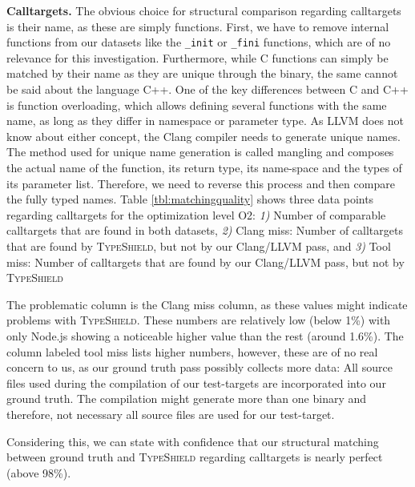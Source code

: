 \textbf{Calltargets.} The obvious choice for structural comparison regarding calltargets is their name, as these are simply functions. First, we have to remove internal 
functions from our datasets like the \texttt{\_init} or \texttt{\_fini} functions, which are of no relevance for this investigation. Furthermore, while C functions can
simply be matched by their name as they are unique through the binary, the same cannot be said about the language C++. One of the key differences between C and C++ is 
function overloading, which allows defining several functions with the same name, as long as they differ in namespace or parameter type. 
As LLVM does not know about either concept, the Clang compiler needs to generate unique names. The method used for unique name generation is called mangling and composes
the actual name of the function, its return type, its name-space and the types of its parameter list. Therefore, we need to reverse this process and then compare the fully
typed names. Table \ref{tbl:matchingquality} shows three data points regarding calltargets for the optimization level O2:
\textit{1)} Number of comparable calltargets that are found in both datasets, 
\textit{2)} Clang miss: Number of calltargets that are found by \textsc{TypeShield}, but not by our Clang/LLVM pass, and 
\textit{3)} Tool miss: Number of calltargets that are found by our Clang/LLVM pass, but not by \textsc{TypeShield}

The problematic column is the Clang miss column, as these values might indicate problems with \textsc{TypeShield}. These numbers are relatively low (below 1\%) with only Node.js
showing a noticeable higher value than the rest (around 1.6\%). The column labeled tool miss lists higher numbers, however, these are of no real concern to us, as our ground truth 
pass possibly collects more data: All source files used during the compilation of our test-targets are incorporated into our ground truth. The compilation might generate more than
one binary and therefore, not necessary all source files are used for our test-target.

Considering this, we can state with confidence that our structural matching between ground truth and \textsc{TypeShield} regarding calltargets is nearly perfect (above 98\%).

